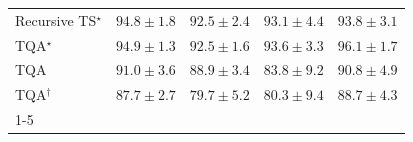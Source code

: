 \begin{tabular}{l|cccc|}
Recursive TS$^\star$ & {\cellcolor[HTML]{034D79}} \color[HTML]{F1F1F1} $94.8\pm 1.8$ & {\cellcolor[HTML]{045A8D}} \color[HTML]{F1F1F1} $92.5\pm 2.4$ & {\cellcolor[HTML]{045788}} \color[HTML]{F1F1F1} $93.1\pm 4.4$ & {\cellcolor[HTML]{045382}} \color[HTML]{F1F1F1} $93.8\pm 3.1$ \\
TQA$^\star$ & {\cellcolor[HTML]{034C78}} \color[HTML]{F1F1F1} $94.9\pm 1.3$ & {\cellcolor[HTML]{045A8D}} \color[HTML]{F1F1F1} $92.5\pm 1.6$ & {\cellcolor[HTML]{045483}} \color[HTML]{F1F1F1} $93.6\pm 3.3$ & {\cellcolor[HTML]{03456C}} \color[HTML]{F1F1F1} $96.1\pm 1.7$ \\
TQA & {\cellcolor[HTML]{046097}} \color[HTML]{F1F1F1} $91.0\pm 3.6$ & {\cellcolor[HTML]{0568A3}} \color[HTML]{F1F1F1} $88.9\pm 3.4$ & {\cellcolor[HTML]{2081B9}} \color[HTML]{F1F1F1} $83.8\pm 9.2$ & {\cellcolor[HTML]{046198}} \color[HTML]{F1F1F1} $90.8\pm 4.9$ \\
TQA$^\dagger$ & {\cellcolor[HTML]{056DAB}} \color[HTML]{F1F1F1} $87.7\pm 2.7$ & {\cellcolor[HTML]{4697C4}} \color[HTML]{F1F1F1} $79.7\pm 5.2$ & {\cellcolor[HTML]{3F93C2}} \color[HTML]{F1F1F1} $80.3\pm 9.4$ & {\cellcolor[HTML]{0569A4}} \color[HTML]{F1F1F1} $88.7\pm 4.3$ \\
\cline{1-5}
\bottomrule
\end{tabular}

